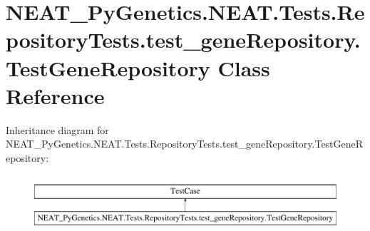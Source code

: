 \hypertarget{class_n_e_a_t___py_genetics_1_1_n_e_a_t_1_1_tests_1_1_repository_tests_1_1test__gene_repository_1_1_test_gene_repository}{}\section{N\+E\+A\+T\+\_\+\+Py\+Genetics.\+N\+E\+A\+T.\+Tests.\+Repository\+Tests.\+test\+\_\+gene\+Repository.\+Test\+Gene\+Repository Class Reference}
\label{class_n_e_a_t___py_genetics_1_1_n_e_a_t_1_1_tests_1_1_repository_tests_1_1test__gene_repository_1_1_test_gene_repository}
Inheritance diagram for N\+E\+A\+T\+\_\+\+Py\+Genetics.\+N\+E\+A\+T.\+Tests.\+Repository\+Tests.\+test\+\_\+gene\+Repository.\+Test\+Gene\+Repository\+:\begin{figure}[H]
\begin{center}
\leavevmode
\includegraphics[height=2.000000cm]{class_n_e_a_t___py_genetics_1_1_n_e_a_t_1_1_tests_1_1_repository_tests_1_1test__gene_repository_1_1_test_gene_repository}
\end{center}
\end{figure}
